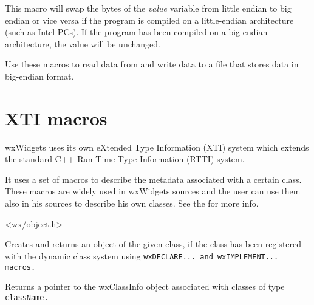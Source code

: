 


This macro will swap the bytes of the {\it value} variable from little
endian to big endian or vice versa if the program is compiled on a
little-endian architecture (such as Intel PCs). If the program has
been compiled on a big-endian architecture, the value will be unchanged.

Use these macros to read data from and write data to a file that stores
data in big-endian format.














\section{XTI macros}\label{rttimacros}

wxWidgets uses its own eXtended Type Information (XTI) system which extends
the standard C++ Run Time Type Information (RTTI) system. 

It uses a set of macros to describe the metadata associated with a certain class.
These macros are widely used in wxWidgets sources and the user can use them also
in his sources to describe his own classes.
See the  for more info.


<wx/object.h>


\label{wxcreatedynamicobject}


Creates and returns an object of the given class, if the class has been
registered with the dynamic class system using \tt{wxDECLARE...} and \tt{wxIMPLEMENT...} macros.


\label{classinfo}


Returns a pointer to the wxClassInfo object associated with classes of type \tt{className}.


